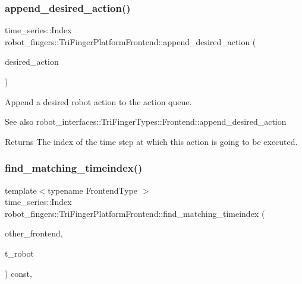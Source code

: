 \subsubsection{\texorpdfstring{append\+\_\+desired\+\_\+action()}{append\_desired\_action()}}
{\footnotesize\ttfamily time\+\_\+series\+::\+Index robot\+\_\+fingers\+::\+Tri\+Finger\+Platform\+Frontend\+::append\+\_\+desired\+\_\+action (\begin{DoxyParamCaption}\item[{const Action \&}]{desired\+\_\+action }\end{DoxyParamCaption})}



Append a desired robot action to the action queue. 

\begin{DoxySeeAlso}{See also}
robot\+\_\+interfaces\+::\+Tri\+Finger\+Types\+::\+Frontend\+::append\+\_\+desired\+\_\+action
\end{DoxySeeAlso}
\begin{DoxyReturn}{Returns}
The index of the time step at which this action is going to be executed. 
\end{DoxyReturn}
\mbox{\label{classrobot__fingers_1_1TriFingerPlatformFrontend_a4c67fd3d8d1e887ed0f5b1b8ec2d30b3}} 
\subsubsection{\texorpdfstring{find\+\_\+matching\+\_\+timeindex()}{find\_matching\_timeindex()}}
{\footnotesize\ttfamily template$<$typename Frontend\+Type $>$ \\
time\+\_\+series\+::\+Index robot\+\_\+fingers\+::\+Tri\+Finger\+Platform\+Frontend\+::find\+\_\+matching\+\_\+timeindex (\begin{DoxyParamCaption}\item[{const Frontend\+Type \&}]{other\+\_\+frontend,  }\item[{const time\+\_\+series\+::\+Index}]{t\+\_\+robot }\end{DoxyParamCaption}) const\hspace{0.3cm}{\ttfamily [inline]}, {\ttfamily [private]}}




